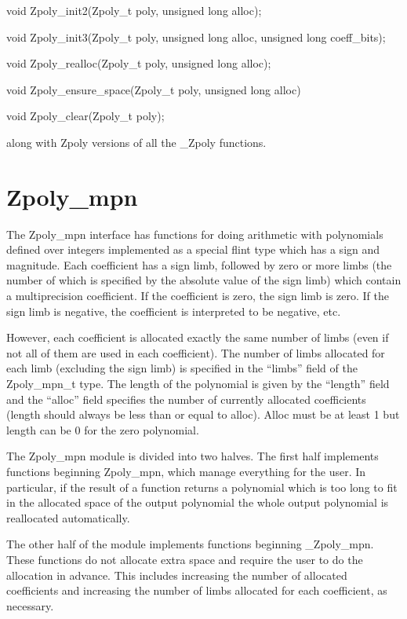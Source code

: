 \documentclass[a4paper,10pt]{article}
\begin{document}
void Zpoly\_init2(Zpoly\_t poly, unsigned long alloc);

void Zpoly\_init3(Zpoly\_t poly, unsigned long alloc, unsigned long coeff\_bits);

void Zpoly\_realloc(Zpoly\_t poly, unsigned long alloc);

void Zpoly\_ensure\_space(Zpoly\_t poly, unsigned long alloc)

void Zpoly\_clear(Zpoly\_t poly);

\vspace{5mm}

along with Zpoly versions of all the \_Zpoly functions.

\section{Zpoly\_mpn}
The Zpoly\_mpn interface has functions for doing arithmetic with polynomials defined over integers implemented as a special flint type which has a sign and magnitude. Each coefficient has a sign limb, followed by zero or more limbs (the number of which is specified by the absolute value of the sign limb) which contain a multiprecision coefficient. If the coefficient is zero, the sign limb is zero. If the sign limb is negative, the coefficient is interpreted to be negative, etc.

However, each coefficient is allocated exactly the same number of limbs (even if not all of them are used in each coefficient). The number of limbs allocated for each limb (excluding the sign limb) is specified in the ``limbs'' field of the Zpoly\_mpn\_t type. The length of the polynomial is given by the ``length'' field and the ``alloc'' field specifies the number of currently allocated coefficients (length should always be less than or equal to alloc). Alloc must be at least 1 but length can be 0 for the zero polynomial. 

The Zpoly\_mpn module is divided into two halves. The first half implements functions beginning Zpoly\_mpn, which manage everything for the user. In particular, if the result of a function returns a polynomial which is too long to fit in the allocated space of the output polynomial the whole output polynomial is reallocated automatically.

The other half of the module implements functions beginning \_Zpoly\_mpn. These functions do not allocate extra space and require the user to do the allocation in advance. This includes increasing the number of allocated coefficients and increasing the number of limbs allocated for each coefficient, as necessary.
\end{document}
